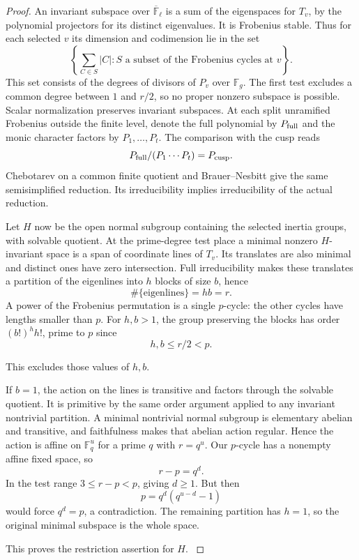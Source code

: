 \begin{proof}
An invariant subspace over \(\overline{\mathbb F}_\ell\)
is a sum of the eigenspaces for \(T_v\), by the polynomial
projectors for its distinct eigenvalues. It is Frobenius stable.
Thus for each selected \(v\) its dimension and codimension lie in
the set
\[
     \left\{\sum_{C\in S}|C|:
          S\text{ a subset of the Frobenius cycles at }v\right\}.
\]
This set consists of the degrees of divisors of \(P_v\)
over \(\mathbb F_g\). The first test excludes a common degree
between \(1\) and \(r/2\), so no proper nonzero subspace
is possible. Scalar normalization preserves invariant subspaces.
At each split unramified Frobenius outside the finite level, denote the full polynomial by \(P_{\rm full}\) and the monic character factors by \(P_1,\dots,P_t\). The comparison with the cusp reads
\[
 P_{\rm full}/(P_1\cdots P_t)=P_{\rm cusp}.
\]
Chebotarev on a common finite quotient and Brauer--Nesbitt give
the same semisimplified reduction. Its irreducibility implies
irreducibility of the actual reduction.

Let \(H\) now be the open normal subgroup containing the selected
inertia groups, with solvable quotient. At the prime-degree
test place a minimal nonzero \(H\)-invariant space is a span of
coordinate lines of \(T_v\). Its translates are also minimal
and distinct ones have zero intersection. Full irreducibility makes these translates a partition of the eigenlines into \(h\) blocks of size \(b\), hence
\[
 \#\{\text{eigenlines}\}=hb=r.
\]
A power of the Frobenius permutation is a single
\(p\)-cycle: the other cycles have lengths smaller than \(p\).
For \(h,b>1\), the group preserving the blocks has order
\((b!)^h h!\), prime to \(p\) since
\[
 h,b\le r/2<p.
\]

This excludes those values of \(h,b\).

If \(b=1\), the action on the lines is transitive and factors
through the solvable quotient. It is primitive by the same
order argument applied to any invariant nontrivial partition.
A minimal nontrivial normal subgroup is elementary abelian
and transitive, and faithfulness makes that abelian action
regular. Hence the action is affine on \(\mathbb F_q^u\)
for a prime \(q\) with \(r=q^u\). Our \(p\)-cycle has a
nonempty affine fixed space, so
\[
 r-p=q^d.
\]
In the test
range \(3\le r-p<p\), giving \(d\ge1\). But then
\[
               p=q^d(q^{u-d}-1)
\]
would force \(q^d=p\), a contradiction. The remaining
partition has \(h=1\), so the original minimal subspace
is the whole space.

This proves the restriction assertion for \(H\). \label{cor:retained-galois-2}
\end{proof}

